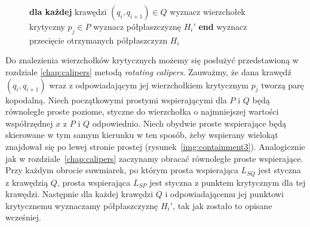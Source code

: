 \begin{figure}[htp]
\begin{algorithmic}[1]

\State \textbf{dla każdej} krawędzi $(q_i, q_{i+1}) \in Q$
\State \hspace{\algorithmicindent} wyznacz wierzchołek krytyczny $p_j \in P$
\State \hspace{\algorithmicindent} wyznacz półpłaszczyznę $H_i'$
\State \textbf{end}
\State wyznacz przecięcie otrzymanych półpłaszczyzn $H_i$

\EndProcedure
\end{algorithmic}
\end{figure}

Do znalezienia wierzchołków krytycznych możemy się posłużyć
przedstawioną w rozdziale \ref{chap:calipers} metodą \emph{rotating
  calipers}. Zauważmy, że dana krawędź $(q_i, q_{i+1})$ wraz z
odpowiadającym jej wierzchołkiem krytycznym $p_j$ tworzą parę
kopodalną. Niech początkowymi prostymi wspierającymi dla $P$ i $Q$
będą równoległe proste poziome, styczne do wierzchołka o najmniejszej
wartości współrzędnej $x$ z $P$ i $Q$ odpowiednio. Niech obydwie
proste wspierające będą skierowane w tym samym kierunku w ten sposób,
żeby wspierany wielokąt znajdował się po lewej stronie prostej
(rysunek~\ref{img:containment3}). Analogicznie jak w
rozdziale~\ref{chap:calipers} zaczynamy obracać równoległe proste
wspierające. Przy każdym obrocie suwmiarek, po którym prosta
wspierająca $L_{SQ}$ jest styczna z krawędzią $Q$, prosta wspierająca
$L_{SP}$ jest styczna z punktem krytycznym dla tej krawędzi. Następnie
dla każdej krawędzi $Q$ i odpowiadającemu jej punktowi krytycznemu
wyznaczamy półpłaszczyznę $H_i'$, tak jak zostało to opisane
wcześniej.

